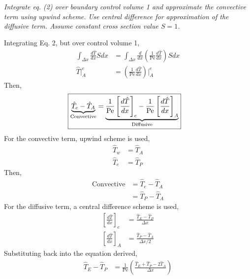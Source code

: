 \section{}
\textit{Integrate eq. (2) over boundary control volume 1 and approximate the convective term using upwind scheme. Use central difference for approximation of the diffusive term. Assume constant cross section value $S = 1$.}


Integrating Eq. 2, but over control volume 1,
\begin{align*}
    \int_{\Delta x} \frac{d \hat{T}}{dx} S dx &= \int_{\Delta x} \frac{d}{dx}\left(\frac{1}{\text{Pe}} \frac{d \hat{T}}{dx}\right) S dx \\
    \hat{T} \bigg|_{A}^{e} &= \left(\frac{1}{\text{Pe}} \frac{d \hat{T}}{dx}\right) \bigg|_{A}^{e}
\end{align*}
Then,
\begin{align*}
    \Aboxed{\underbrace{\hat{T}_e - \hat{T}_A}_{\text{Convective}} &= \underbrace{\frac{1}{\text{Pe}} \left[\frac{d \hat{T}}{dx}\right]_e - \frac{1}{\text{Pe}} \left[\frac{d \hat{T}}{dx}\right]_A}_{\text{Diffusive}}}
\end{align*}
For the convective term, upwind scheme is used,
\begin{align*}
    \hat{T}_w &= \hat{T}_A \\
    \hat{T}_e &= \hat{T}_P
\end{align*}
Then,
\begin{align*}
    \text{Convective} &= \hat{T}_e - \hat{T}_A \\
    &= \hat{T}_P - \hat{T}_A
\end{align*}
For the diffusive term, a central difference scheme is used,
\begin{align*}
    \left[\frac{d \hat{T}}{dx}\right]_e &= \frac{\hat{T}_E - \hat{T}_P}{\Delta x} \\
    \left[\frac{d \hat{T}}{dx}\right]_A &= \frac{\hat{T}_P - \hat{T}_A}{\Delta x/2}
\end{align*}
Substituting back into the equation derived,
\begin{align*}
    \hat{T}_E - \hat{T}_P &= \frac{1}{\text{Pe}} \left(\frac{\hat{T}_E + \hat{T}_P - 2\hat{T}_A}{\Delta x}\right) 
\end{align*}